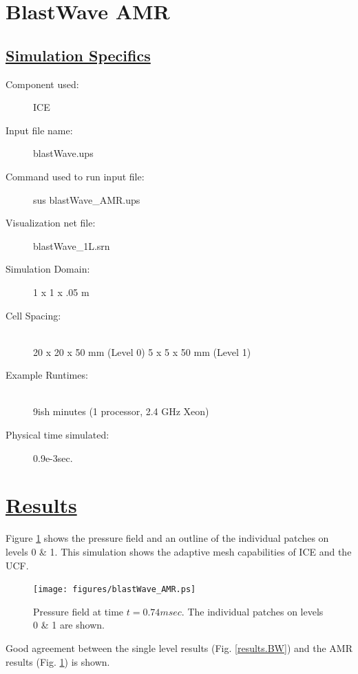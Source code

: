 \documentclass[fleqn]{article}
\begin{document}
\section*{\center BlastWave AMR}
\subsection*{\underline{Simulation Specifics}}
\begin{description} 
\item [Component used:] \hfill ICE
\item [Input file name:] \hfill blastWave.ups
\item [Command used to run input file:]\hfill sus blastWave\_AMR.ups
\item [Visualization net file:]\hfill blastWave\_1L.srn\\


\item [Simulation Domain:]\hfill    1 x 1 x .05 m
\item [Cell Spacing:]\hfill \\ 
20 x 20 x 50 mm (Level 0) 
5 x 5 x 50 mm (Level 1)


\item [Example Runtimes:] \hfill \\
 9ish minutes   (1 processor, 2.4 GHz Xeon)

\item [Physical time simulated:] \hfill 0.9e-3sec.

\end{description}

\section*{\underline{Results}}
Figure \ref{results.BW.AMR} shows the pressure field and an outline of the individual patches on
levels 0 \& 1.  This simulation shows the adaptive mesh capabilities of ICE and the UCF.  
\begin{figure}
\texttt{[image: figures/blastWave\_AMR.ps]}
\caption{Pressure field at time $t = 0.74msec$.  The individual patches on levels 0 \& 1 are shown.}
\label{results.BW.AMR}
\end{figure}
Good agreement between the single level results (Fig. \ref{results.BW}) and the AMR results (Fig. \ref{results.BW.AMR}) is shown.
\newpage


\end{document}
